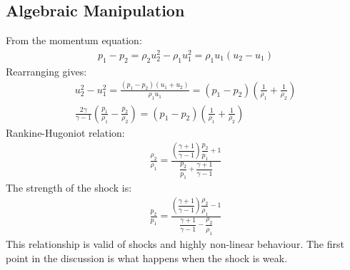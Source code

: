 \subsection{Algebraic Manipulation}
From the momentum equation:
\begin{gather}
    p_1 - p_2 = \rho_2 u_2^2 - \rho_1 u_1^2 = \rho_1 u_1 (u_2-u_1)
\end{gather}
Rearranging gives:
\begin{gather}
    u_2^2 - u_1^2 = \frac{(p_1-p_2)(u_1+u_2)}{\rho_1 u_1} = (p_1-p_2) \left( \frac{1}{\rho_1} + \frac{1}{\rho_2} \right) \\[5pt]
    \frac{2\gamma}{\gamma-1} \left( \frac{p_1}{\rho_1} - \frac{p_2}{\rho_2} \right) = (p_1-p_2) \left( \frac{1}{\rho_1} + \frac{1}{\rho_2} \right)
\end{gather}
Rankine-Hugoniot relation:
\begin{gather}
    \frac{\rho_2}{\rho_1} = \frac{\left(\dfrac{\gamma+1}{\gamma-1}\right)\dfrac{p_2}{p_1}+1}{\dfrac{p_2}{p_1} + \dfrac{\gamma+1}{\gamma-1}}
\end{gather}
The strength of the shock is:
\begin{gather}
    \frac{p_2}{p_1} = \frac{\left(\dfrac{\gamma+1}{\gamma-1}\right)\dfrac{\rho_2}{\rho_1}-1}{\dfrac{\gamma+1}{\gamma-1} - \dfrac{\rho_2}{\rho_1}}
\end{gather}
This relationship is valid of shocks and highly non-linear behaviour.
The first point in the discussion is what happens when the shock is weak.
